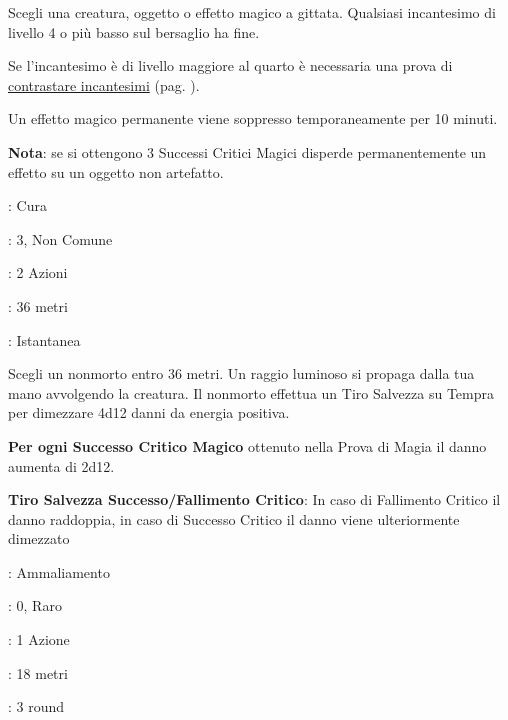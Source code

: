 \begin{multicols}{2}
Scegli una creatura, oggetto o effetto magico a gittata. Qualsiasi incantesimo di livello 4 o più basso sul bersaglio ha fine.

Se l'incantesimo è di livello maggiore al quarto è necessaria una prova di \hyperlink{contrastareincantesimi}{contrastare incantesimi} (pag. \pageref{contrastareincantesimi}).

Un effetto magico permanente viene soppresso temporaneamente per 10 minuti.

\textbf{Nota}: se si ottengono 3 Successi Critici Magici disperde permanentemente un effetto su un oggetto non artefatto.

\noindent\colorbox{OBSSgold!10}{
\begin{minipage}{0.95\linewidth}
\begin{description}[noitemsep, topsep=0pt, parsep=0pt, partopsep=0pt, leftmargin=0cm, labelwidth=1.3cm]
	\item[\textbf{Lista}]: Cura
	\item[\textbf{Livello}]: 3, Non Comune
	\item[\textbf{Lancio}]: 2 Azioni
	\item[\textbf{Gittata}]: 36 metri
	\item[\textbf{Durata}]: Istantanea
\end{description}
\end{minipage}}\smallskip

Scegli un nonmorto entro 36 metri. Un raggio luminoso si propaga dalla tua mano avvolgendo la creatura. Il nonmorto effettua un Tiro Salvezza su Tempra per dimezzare 4d12 danni da energia positiva.

\textbf{Per ogni Successo Critico Magico} ottenuto nella Prova di Magia il danno aumenta di 2d12.

\textbf{Tiro Salvezza Successo/Fallimento Critico}: In caso di Fallimento Critico il danno raddoppia, in caso di Successo Critico il danno viene ulteriormente dimezzato

\noindent\colorbox{OBSSgold!10}{
\begin{minipage}{0.95\linewidth}
\begin{description}[noitemsep, topsep=0pt, parsep=0pt, partopsep=0pt, leftmargin=0cm, labelwidth=1.3cm]
	\item[\textbf{Lista}]: Ammaliamento
	\item[\textbf{Livello}]: 0, Raro
	\item[\textbf{Lancio}]: 1 Azione
	\item[\textbf{Gittata}]: 18 metri
	\item[\textbf{Durata}]: 3 round
\end{description}
\end{minipage}}\smallskip


\end{multicols}
